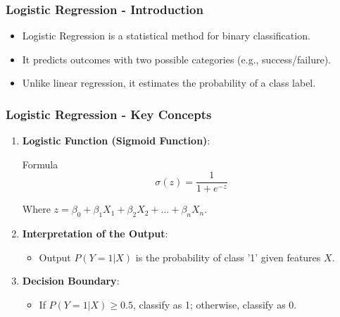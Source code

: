\documentclass[aspectratio=169]{beamer}
\begin{document}
\begin{frame}[fragile]
    \frametitle{Logistic Regression - Introduction}
    \begin{itemize}
        \item Logistic Regression is a statistical method for binary classification.
        \item It predicts outcomes with two possible categories (e.g., success/failure).
        \item Unlike linear regression, it estimates the probability of a class label.
    \end{itemize}
\end{frame}

\begin{frame}[fragile]
    \frametitle{Logistic Regression - Key Concepts}
    \begin{enumerate}
        \item \textbf{Logistic Function (Sigmoid Function)}:
        \begin{block}{Formula}
            \[
            \sigma(z) = \frac{1}{1 + e^{-z}}
            \]
        \end{block}
        Where \( z = \beta_0 + \beta_1X_1 + \beta_2X_2 + ... + \beta_nX_n \).
        
        \item \textbf{Interpretation of the Output}:
        \begin{itemize}
            \item Output \( P(Y=1 | X) \) is the probability of class '1' given features \( X \).
        \end{itemize}
        
        \item \textbf{Decision Boundary}:
        \begin{itemize}
            \item If \( P(Y=1 | X) \geq 0.5 \), classify as 1; otherwise, classify as 0.
        \end{itemize}
    \end{enumerate}
\end{frame}
\end{document}
